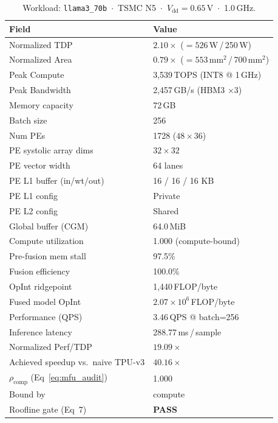 \begin{table}[h]
\centering
\caption{Workload: \texttt{llama3\_70b}~$\cdot$~TSMC N5~$\cdot$~$V_\text{dd}=0.65$\,V~$\cdot$~1.0\,GHz.}
\label{tab:cheetah_v2_llama3_70b}
\small\setlength{\tabcolsep}{6pt}
\begin{tabular}{@{}ll@{}}
\toprule
\textbf{Field} & \textbf{Value} \\
\midrule
Normalized TDP          & $2.10\times$ ($= 526$\,W\,/\,250\,W) \\
Normalized Area         & $0.79\times$ ($= 553$\,mm$^2$\,/\,700\,mm$^2$) \\
Peak Compute            & 3{,}539\,TOPS (INT8 @ 1\,GHz) \\
Peak Bandwidth          & 2{,}457\,GB/s (HBM3 $\times$3) \\
Memory capacity         & 72\,GB \\
Batch size              & 256 \\
Num PEs                 & 1728 ($48 \times 36$) \\
PE systolic array dims  & $32 \times 32$ \\
PE vector width         & 64 lanes \\
PE L1 buffer (in/wt/out) & 16 / 16 / 16 KB \\
PE L1 config            & Private \\
PE L2 config            & Shared \\
Global buffer (CGM)     & 64.0\,MiB \\
\midrule
Compute utilization     & 1.000 (compute-bound) \\
Pre-fusion mem stall    & 97.5\% \\
Fusion efficiency       & 100.0\% \\
OpInt ridgepoint        & 1{,}440\,FLOP/byte \\
Fused model OpInt       & $2.07 \times 10^{6}$\,FLOP/byte \\
Performance (QPS)       & 3.46\,QPS @ batch=256 \\
Inference latency       & 288.77\,ms\,/\,sample \\
Normalized Perf/TDP     & $19.09\times$ \\
Achieved speedup vs.\ naive TPU-v3 & $40.16\times$ \\
$\rho_{\mathrm{comp}}$ (Eq~\ref{eq:mfu_audit}) & 1.000 \\
Bound by                & compute \\
Roofline gate (Eq~7)    & \textcolor{green!60!black}{\textbf{PASS}} \\

\end{tabular}
\end{table}
